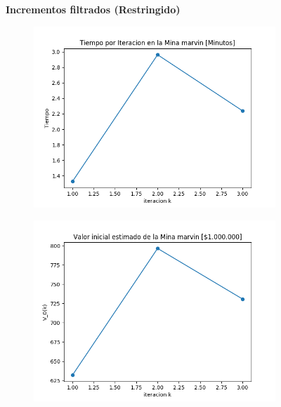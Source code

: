 \documentclass[12pt,letterpaper]{article}
\begin{document}
\begin{figure}[H]
  \captionsetup[subfigure]{labelformat=empty}
  \centering
  \textbf{Incrementos filtrados (Restringido)}
  
  \begin{subfigure}[b]{0.4\textwidth}
     \includegraphics[width=\textwidth]{Graficos/Incrementos_filtrados/restringido/marvinml_inc_times.png}
     \caption{}
     \label{fig:ex1}
  \end{subfigure}
  \begin{subfigure}[b]{0.4\textwidth}
     \includegraphics[width=\textwidth]{Graficos/Incrementos_filtrados/restringido/marvinml_inc_v_k.png}
     \caption{}
     \label{fig:ex2}
  \end{subfigure}
  

\end{figure}
\end{document}
